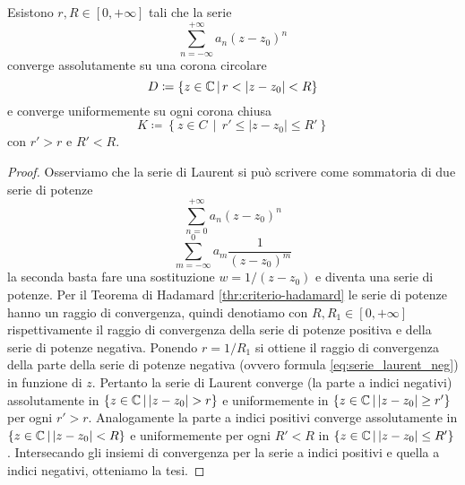 \begin{proposition}
  Esistono $r, R \in \left[ 0, +\infty \right]$ tali che la serie 
  \begin{equation*}
    \sum_{n=-\infty}^{+\infty} a_n(z-z_0)^n
  \end{equation*}
  converge assolutamente su una corona circolare 
  \begin{equation*}
    D \coloneqq \left\{ z \in \mathbb{C} \,\middle|\, r < |z-z_0| < R \right\}
  \end{equation*}
  e converge uniformemente su ogni corona chiusa
  \begin{equation*}
    K \coloneqq \left\{ z \in C \,\middle|\, r' \le |z-z_0| \le R' \right\}
  \end{equation*}
  con $r' > r$ e $R' < R$.
  \label{prp:convergenza_ass_unif_laurent}
\end{proposition}
\begin{proof}
  Osserviamo che la serie di Laurent si può scrivere come sommatoria di due serie di
  potenze
  \begin{equation*}
  \sum_{n=0}^{+\infty} a_n (z-z_0)^{n} 
  \end{equation*}
  \begin{equation*}
  \sum_{m=-\infty}^{0} a_{m} \frac{1}{(z-z_0)^{m}}
  \end{equation*}
  la seconda basta fare una sostituzione $w = 1/(z-z_0)$ e diventa una serie di
  potenze.
  Per il Teorema di Hadamard \ref{thr:criterio-hadamard} le serie di potenze
  hanno un raggio di convergenza, quindi denotiamo con $R, R_1 \in \left[ 0, 
  +\infty \right]$ rispettivamente il raggio di convergenza della serie di
  potenze positiva e della serie di potenze
  negativa. Ponendo $r = 1/R_1$ si ottiene il raggio di
  convergenza della parte della serie di potenze negativa (ovvero formula
  \ref{eq:serie_laurent_neg}) in funzione di $z$. Pertanto la serie di Laurent
  converge (la parte a indici negativi) assolutamente in 
  $\left\{z \in \mathbb{C} \,\middle|\, |z-z_0| > r \right\}$
  e uniformemente in $\left\{ z \in \mathbb{C} \,\middle|\, |z-z_0| \ge r' \right\}$ per
  ogni $r' > r$. Analogamente la parte a indici positivi converge assolutamente
  in $\left\{ z \in \mathbb{C} \,\middle|\, |z -z_0| < R  \right\}$ e uniformemente per
  ogni $R' < R$ in $\left\{ z \in \mathbb{C} \,\middle|\, |z -z_0| \le R'  \right\}$.
  Intersecando gli insiemi di convergenza per la serie a indici positivi
  e quella a indici negativi, otteniamo la tesi.
\end{proof}

